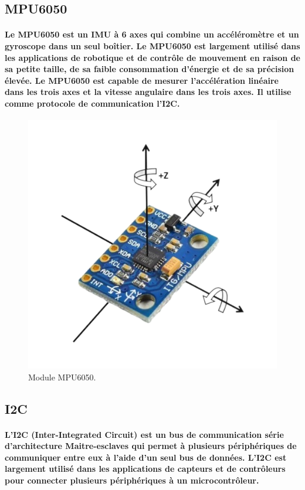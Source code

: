 \subsection{MPU6050}

\paragraph{Le MPU6050 est un IMU à 6 axes qui combine un accéléromètre et un gyroscope dans un seul boîtier. Le MPU6050 est largement utilisé dans les applications de robotique et de contrôle de mouvement en raison de sa petite taille, de sa faible consommation d'énergie et de sa précision élevée. Le MPU6050 est capable de mesurer l'accélération linéaire dans les trois axes et la vitesse angulaire dans les trois axes. Il utilise comme protocole de communication l'I2C.}

\begin{figure}[!htpb]
    \centering
    \includegraphics[width=0.8\linewidth]{Figures/mpu6050.png}
    \caption[Module MPU6050]{Module MPU6050.}
    \label{fig:mpu-6050}
\end{figure}


\subsection{I2C}

\paragraph{L'I2C (Inter-Integrated Circuit) est un bus de communication série d'architecture Maitre-esclaves qui permet à plusieurs périphériques de communiquer entre eux à l'aide d'un seul bus de données. L'I2C est largement utilisé dans les applications de capteurs et de contrôleurs pour connecter plusieurs périphériques à un microcontrôleur.}

